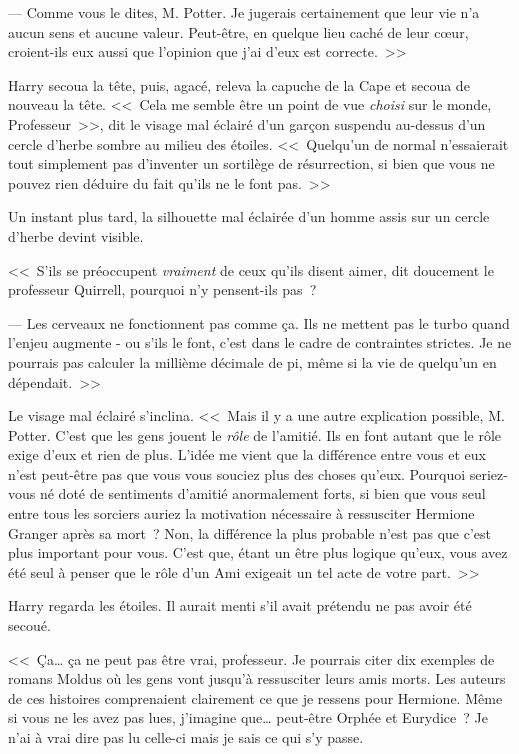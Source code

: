--- Comme vous le dites, M. Potter. Je jugerais certainement que leur vie n'a aucun sens et aucune valeur. Peut-être, en quelque lieu caché de leur cœur, croient-ils eux aussi que l'opinion que j'ai d'eux est correcte.~>>

Harry secoua la tête, puis, agacé, releva la capuche de la Cape et secoua de nouveau la tête. <<~Cela me semble être un point de vue \emph{choisi} sur le monde, Professeur~>>, dit le visage mal éclairé d'un garçon suspendu au-dessus d'un cercle d'herbe sombre au milieu des étoiles. <<~Quelqu'un de normal n'essaierait tout simplement pas d'inventer un sortilège de résurrection, si bien que vous ne pouvez rien déduire du fait qu'ils ne le font pas.~>>

Un instant plus tard, la silhouette mal éclairée d'un homme assis sur un cercle d'herbe devint visible.

<<~S'ils se préoccupent \emph{vraiment} de ceux qu'ils disent aimer, dit doucement le professeur Quirrell, pourquoi n'y pensent-ils pas~?

--- Les cerveaux ne fonctionnent pas comme ça. Ils ne mettent pas le turbo quand l'enjeu augmente - ou s'ils le font, c'est dans le cadre de contraintes strictes. Je ne pourrais pas calculer la millième décimale de pi, même si la vie de quelqu'un en dépendait.~>>

Le visage mal éclairé s'inclina. <<~Mais il y a une autre explication possible, M. Potter. C'est que les gens jouent le \emph{rôle} de l'amitié. Ils en font autant que le rôle exige d'eux et rien de plus. L'idée me vient que la différence entre vous et eux n'est peut-être pas que vous vous souciez plus des choses qu'eux. Pourquoi seriez-vous né doté de sentiments d'amitié anormalement forts, si bien que vous seul entre tous les sorciers auriez la motivation nécessaire à ressusciter Hermione Granger après sa mort~? Non, la différence la plus probable n'est pas que c'est plus important pour vous. C'est que, étant un être plus logique qu'eux, vous avez été seul à penser que le rôle d'un Ami exigeait un tel acte de votre part.~>>

Harry regarda les étoiles. Il aurait menti s'il avait prétendu ne pas avoir été secoué.

<<~Ça… ça ne peut pas être vrai, professeur. Je pourrais citer dix exemples de romans Moldus où les gens vont jusqu'à ressusciter leurs amis morts. Les auteurs de ces histoires comprenaient clairement ce que je ressens pour Hermione. Même si vous ne les avez pas lues, j'imagine que… peut-être Orphée et Eurydice~? Je n'ai à vrai dire pas lu celle-ci mais je sais ce qui s'y passe.

